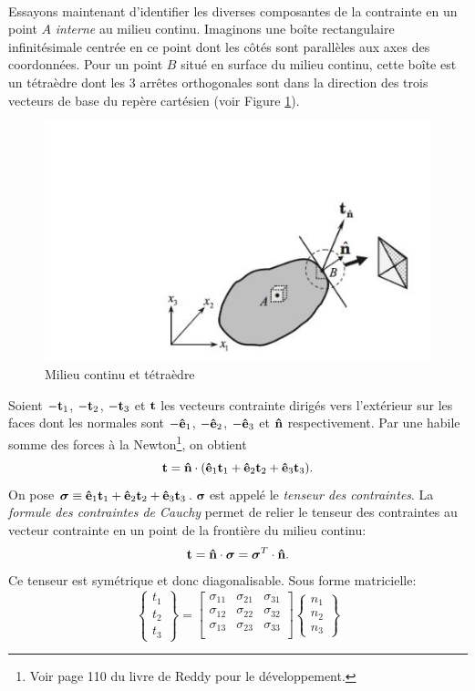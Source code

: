 \paragraph{}
Essayons maintenant d'identifier les diverses composantes de la contrainte en un point $A$ \emph{interne} au milieu continu. Imaginons une boîte rectangulaire infinitésimale centrée en ce point dont les côtés sont parallèles aux axes des coordonnées. Pour un point $B$ situé en surface du milieu continu, cette boîte est un tétraèdre dont les 3 arrêtes orthogonales sont dans la direction des trois vecteurs de base du repère cartésien (voir Figure \ref{fig:tetra}).
\begin{figure}[!h]
 \centering
 \includegraphics[scale=0.65]{./patate.jpg}
 \caption{Milieu continu et tétraèdre}
 \label{fig:tetra}
 \end{figure}
  Soient $-\textbf{t}_1$, $-\textbf{t}_2$, $-\textbf{t}_3$ et $ \textbf{t}$ les vecteurs contrainte dirigés vers l'extérieur sur les faces dont les normales sont $-\textbf{ê}_1$,  $-\textbf{ê}_2$, $-\textbf{ê}_3$ et $\textbf{\^n}$ respectivement. Par une habile somme des forces à la Newton\footnote{Voir page 110 du livre de Reddy pour le développement.}, on obtient $$\textbf{t}=\textbf{\^n}\cdot(\textbf{ê}_1\textbf{t}_1+\textbf{ê}_2\textbf{t}_2+\textbf{ê}_3\textbf{t}_3).$$
On pose $\boldsymbol{\sigma}\equiv\textbf{ê}_1\textbf{t}_1+\textbf{ê}_2\textbf{t}_2+\textbf{ê}_3\textbf{t}_3$. $\boldsymbol{\sigma}$ est appelé le \emph{tenseur des contraintes}. La \emph{formule des contraintes de Cauchy} permet de relier le tenseur des contraintes au vecteur contrainte en un point de la frontière du milieu continu:
$$\textbf{t}=\textbf{\^n}\cdot\boldsymbol{\sigma}=\boldsymbol{\sigma}^T\cdot\textbf{\^n}.$$
Ce tenseur est symétrique et donc diagonalisable. Sous forme matricielle:
$$\left\{\begin{array}{c}
t_1\\
t_2\\
t_3
\end{array}\right\}
=\left[
\begin{array}{ccc}
\sigma_{11}&\sigma_{21}&\sigma_{31}\\
\sigma_{12}&\sigma_{22}&\sigma_{32}\\
\sigma_{13}&\sigma_{23}&\sigma_{33}\\
\end{array} \right]
\left\{\begin{array}{c}
n_1\\
n_2\\
n_3
\end{array}\right\}$$
